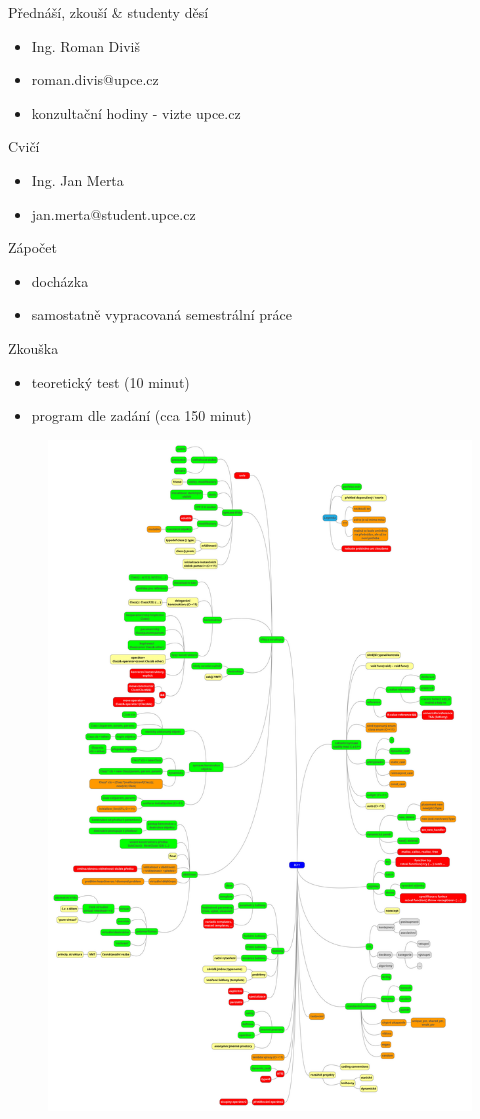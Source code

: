 

\begin{frame}[fragile]
\begin{block}{Přednáší, zkouší \& studenty děsí}
\begin{itemize}
\item Ing. Roman Diviš
\item roman.divis@upce.cz
\item konzultační hodiny - vizte upce.cz
\end{itemize}
\end{block}

\begin{block}{Cvičí}
\begin{itemize}
\item Ing. Jan Merta
\item jan.merta@student.upce.cz
\end{itemize}
\end{block}
\end{frame}



\begin{frame}[fragile]
\begin{block}{Zápočet}
\begin{itemize}
\item docházka
\item samostatně vypracovaná semestrální práce
\end{itemize}
\end{block}

\begin{block}{Zkouška}
\begin{itemize}
\item teoretický test (10 minut)
\item program dle zadání (cca 150 minut)
\end{itemize}
\end{block}
\end{frame}



\begin{frame}[fragile]
\vfill
\begin{figure}
\centering
\includegraphics[width=0.48\linewidth]{img/mindmap.pdf}
\end{figure}
\vfill
\end{frame}